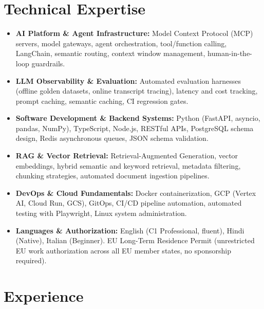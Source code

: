 \documentclass[10pt,a4paper]{article}
\begin{document}
\section{Technical Expertise}
\begin{itemize}
  \item \textbf{AI Platform \& Agent Infrastructure:} Model Context Protocol (MCP) servers, model gateways, agent orchestration, tool/function calling, LangChain, semantic routing, context window management, human-in-the-loop guardrails.
  \item \textbf{LLM Observability \& Evaluation:} Automated evaluation harnesses (offline golden datasets, online transcript tracing), latency and cost tracking, prompt caching, semantic caching, CI regression gates.
  \item \textbf{Software Development \& Backend Systems:} Python (FastAPI, asyncio, pandas, NumPy), TypeScript, Node.js, RESTful APIs, PostgreSQL schema design, Redis asynchronous queues, JSON schema validation.
  \item \textbf{RAG \& Vector Retrieval:} Retrieval-Augmented Generation, vector embeddings, hybrid semantic and keyword retrieval, metadata filtering, chunking strategies, automated document ingestion pipelines.
  \item \textbf{DevOps \& Cloud Fundamentals:} Docker containerization, GCP (Vertex AI, Cloud Run, GCS), GitOps, CI/CD pipeline automation, automated testing with Playwright, Linux system administration.
  \item \textbf{Languages \& Authorization:} English (C1 Professional, fluent), Hindi (Native), Italian (Beginner). EU Long-Term Residence Permit (unrestricted EU work authorization across all EU member states, no sponsorship required).
\end{itemize}

\section{Experience}
\end{document}
